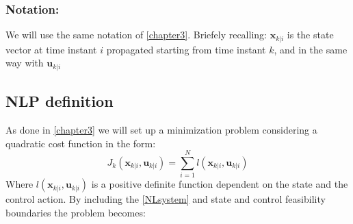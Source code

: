 \subsubsection*{Notation:}
We will use the same notation of \ref{chapter3}. Briefely recalling: $\textbf{x}_{k|i}$ is the state vector at time instant $i$ propagated starting from time instant $k$, and in the same way with $\textbf{u}_{k|i}$

\subsection{NLP definition}

As done in \ref{chapter3} we will set up a minimization problem considering a quadratic cost function in the form:
\begin{equation}
J_{k}(\textbf{x}_{k|i},\textbf{u}_{k|i})=\sum_{i=1}^{N}l(\textbf{x}_{k|i},\textbf{u}_{k|i})
\end{equation} 
Where $l(\textbf{x}_{k|i},\textbf{u}_{k|i})$ is a positive definite function dependent on the state and the control action. By including the \ref{NLsystem} and state and control feasibility boundaries the problem becomes: 

